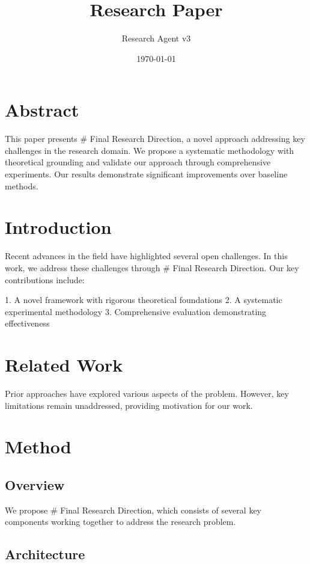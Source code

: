 \documentclass[11pt,a4paper]{article}
\title{Research Paper}
\author{Research Agent v3}
\date{\today}
\begin{document}
\maketitle


\section{Abstract}

This paper presents # Final Research Direction, a novel approach addressing key challenges in the research domain. We propose a systematic methodology with theoretical grounding and validate our approach through comprehensive experiments. Our results demonstrate significant improvements over baseline methods.

\section{Introduction}

Recent advances in the field have highlighted several open challenges. In this work, we address these challenges through # Final Research Direction. Our key contributions include:

1. A novel framework with rigorous theoretical foundations
2. A systematic experimental methodology
3. Comprehensive evaluation demonstrating effectiveness

\section{Related Work}

Prior approaches have explored various aspects of the problem. However, key limitations remain unaddressed, providing motivation for our work.

\section{Method}

\subsection{Overview}

We propose # Final Research Direction, which consists of several key components working together to address the research problem.

\subsection{Architecture}
\end{document}
